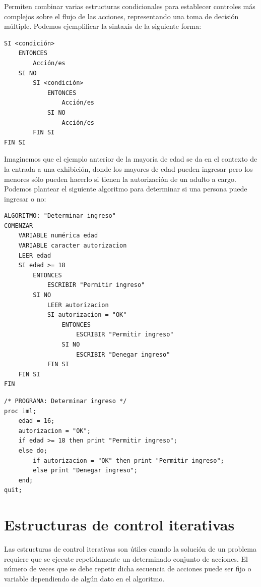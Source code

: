 \documentclass[]{book}
\begin{document}
Permiten combinar varias estructuras condicionales para establecer
controles más complejos sobre el flujo de las acciones, representando
una toma de decisión múltiple. Podemos ejemplificar la sintaxis de la
siguiente forma:

\begin{verbatim}
SI <condición> 
    ENTONCES
        Acción/es
    SI NO
        SI <condición> 
            ENTONCES
                Acción/es
            SI NO
                Acción/es
        FIN SI
FIN SI
\end{verbatim}

Imaginemos que el ejemplo anterior de la mayoría de edad se da en el
contexto de la entrada a una exhibición, donde los mayores de edad
pueden ingresar pero los menores sólo pueden hacerlo si tienen la
autorización de un adulto a cargo. Podemos plantear el siguiente
algoritmo para determinar si una persona puede ingresar o no:

\begin{verbatim}
ALGORITMO: "Determinar ingreso"
COMENZAR
    VARIABLE numérica edad
    VARIABLE caracter autorizacion
    LEER edad
    SI edad >= 18 
        ENTONCES
            ESCRIBIR "Permitir ingreso"
        SI NO
            LEER autorizacion
            SI autorizacion = "OK" 
                ENTONCES
                    ESCRIBIR "Permitir ingreso"
                SI NO
                    ESCRIBIR "Denegar ingreso"
            FIN SI
    FIN SI
FIN
\end{verbatim}

\begin{verbatim}
/* PROGRAMA: Determinar ingreso */
proc iml;
    edad = 16;
    autorizacion = "OK";
    if edad >= 18 then print "Permitir ingreso";
    else do;
        if autorizacion = "OK" then print "Permitir ingreso";
        else print "Denegar ingreso";
    end;
quit;
\end{verbatim}

\section{Estructuras de control
iterativas}\label{estructuras-de-control-iterativas}

Las estructuras de control iterativas son útiles cuando la solución de
un problema requiere que se ejecute repetidamente un determinado
conjunto de acciones. El número de veces que se debe repetir dicha
secuencia de acciones puede ser fijo o variable dependiendo de algún
dato en el algoritmo.
\end{document}
